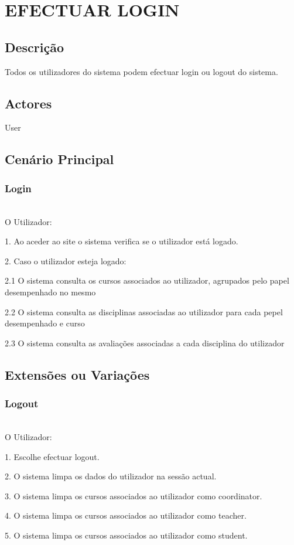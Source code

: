 \section{EFECTUAR LOGIN}
\subsection{Descrição}
Todos os utilizadores do sistema podem efectuar login ou logout do sistema. 

\subsection{Actores}
User

\subsection{Cenário Principal}
 
\subsubsection{Login}
  \\

O Utilizador:

1. Ao aceder ao site o sistema verifica se o utilizador está logado.

2. Caso o utilizador esteja logado:

2.1 O sistema consulta os cursos associados ao utilizador, agrupados pelo papel desempenhado no mesmo

2.2 O sistema consulta as disciplinas associadas ao utilizador para cada pepel desempenhado e curso

2.3 O sistema consulta as avaliações associadas a cada disciplina do utilizador

\subsection{Extensões ou Variações} 


\subsubsection{Logout}
 \\

O Utilizador:

1. Escolhe efectuar logout.

2. O sistema limpa os dados do utilizador na sessão actual.

3. O sistema limpa os cursos associados ao utilizador como coordinator.

4. O sistema limpa os cursos associados ao utilizador como teacher.

5. O sistema limpa os cursos associados ao utilizador como student.